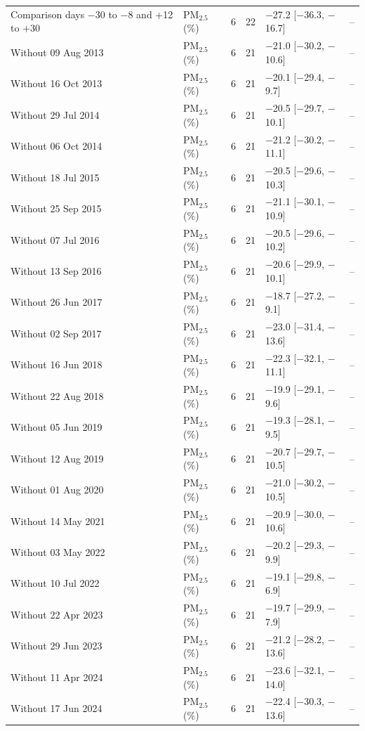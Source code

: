 \begin{longtable}{L{4.6cm} L{2.6cm} C{0.5cm} C{0.8cm} C{3.2cm} C{3.2cm}}
Comparison days $-$30 to $-$8 and +12 to +30 & PM$_{2.5}$ (\%) & 6 & 22 & $-$27.2 {\scriptsize[$-$36.3, $-$16.7]} & -- \\
Without 09 Aug 2013 & PM$_{2.5}$ (\%) & 6 & 21 & $-$21.0 {\scriptsize[$-$30.2, $-$10.6]} & -- \\
Without 16 Oct 2013 & PM$_{2.5}$ (\%) & 6 & 21 & $-$20.1 {\scriptsize[$-$29.4, $-$9.7]} & -- \\
Without 29 Jul 2014 & PM$_{2.5}$ (\%) & 6 & 21 & $-$20.5 {\scriptsize[$-$29.7, $-$10.1]} & -- \\
Without 06 Oct 2014 & PM$_{2.5}$ (\%) & 6 & 21 & $-$21.2 {\scriptsize[$-$30.2, $-$11.1]} & -- \\
Without 18 Jul 2015 & PM$_{2.5}$ (\%) & 6 & 21 & $-$20.5 {\scriptsize[$-$29.6, $-$10.3]} & -- \\
Without 25 Sep 2015 & PM$_{2.5}$ (\%) & 6 & 21 & $-$21.1 {\scriptsize[$-$30.1, $-$10.9]} & -- \\
Without 07 Jul 2016 & PM$_{2.5}$ (\%) & 6 & 21 & $-$20.5 {\scriptsize[$-$29.6, $-$10.2]} & -- \\
Without 13 Sep 2016 & PM$_{2.5}$ (\%) & 6 & 21 & $-$20.6 {\scriptsize[$-$29.9, $-$10.1]} & -- \\
Without 26 Jun 2017 & PM$_{2.5}$ (\%) & 6 & 21 & $-$18.7 {\scriptsize[$-$27.2, $-$9.1]} & -- \\
Without 02 Sep 2017 & PM$_{2.5}$ (\%) & 6 & 21 & $-$23.0 {\scriptsize[$-$31.4, $-$13.6]} & -- \\
Without 16 Jun 2018 & PM$_{2.5}$ (\%) & 6 & 21 & $-$22.3 {\scriptsize[$-$32.1, $-$11.1]} & -- \\
Without 22 Aug 2018 & PM$_{2.5}$ (\%) & 6 & 21 & $-$19.9 {\scriptsize[$-$29.1, $-$9.6]} & -- \\
Without 05 Jun 2019 & PM$_{2.5}$ (\%) & 6 & 21 & $-$19.3 {\scriptsize[$-$28.1, $-$9.5]} & -- \\
Without 12 Aug 2019 & PM$_{2.5}$ (\%) & 6 & 21 & $-$20.7 {\scriptsize[$-$29.7, $-$10.5]} & -- \\
Without 01 Aug 2020 & PM$_{2.5}$ (\%) & 6 & 21 & $-$21.0 {\scriptsize[$-$30.2, $-$10.5]} & -- \\
Without 14 May 2021 & PM$_{2.5}$ (\%) & 6 & 21 & $-$20.9 {\scriptsize[$-$30.0, $-$10.6]} & -- \\
Without 03 May 2022 & PM$_{2.5}$ (\%) & 6 & 21 & $-$20.2 {\scriptsize[$-$29.3, $-$9.9]} & -- \\
Without 10 Jul 2022 & PM$_{2.5}$ (\%) & 6 & 21 & $-$19.1 {\scriptsize[$-$29.8, $-$6.9]} & -- \\
Without 22 Apr 2023 & PM$_{2.5}$ (\%) & 6 & 21 & $-$19.7 {\scriptsize[$-$29.9, $-$7.9]} & -- \\
Without 29 Jun 2023 & PM$_{2.5}$ (\%) & 6 & 21 & $-$21.2 {\scriptsize[$-$28.2, $-$13.6]} & -- \\
Without 11 Apr 2024 & PM$_{2.5}$ (\%) & 6 & 21 & $-$23.6 {\scriptsize[$-$32.1, $-$14.0]} & -- \\
Without 17 Jun 2024 & PM$_{2.5}$ (\%) & 6 & 21 & $-$22.4 {\scriptsize[$-$30.3, $-$13.6]} & -- \\
\end{longtable}
\endgroup
